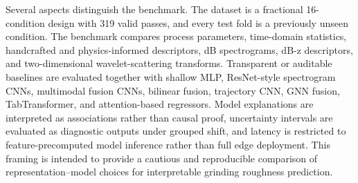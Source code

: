 Several aspects distinguish the benchmark. The dataset is a fractional 16-condition design with 319 valid passes, and every test fold is a previously unseen condition. The benchmark compares process parameters, time-domain statistics, handcrafted and physics-informed descriptors, dB spectrograms, dB-z descriptors, and two-dimensional wavelet-scattering transforms. Transparent or auditable baselines are evaluated together with shallow MLP, ResNet-style spectrogram CNNs, multimodal fusion CNNs, bilinear fusion, trajectory CNN, GNN fusion, TabTransformer, and attention-based regressors. Model explanations are interpreted as associations rather than causal proof, uncertainty intervals are evaluated as diagnostic outputs under grouped shift, and latency is restricted to feature-precomputed model inference rather than full edge deployment. This framing is intended to provide a cautious and reproducible comparison of representation--model choices for interpretable grinding roughness prediction.
